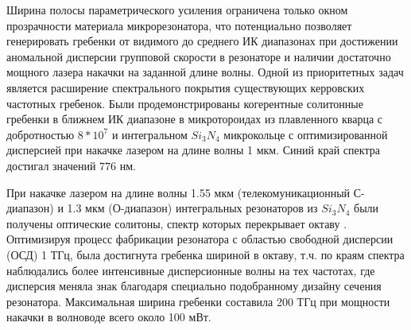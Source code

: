 Ширина полосы параметрического усиления ограничена только окном прозрачности материала микрорезонатора, что потенциально позволяет генерировать гребенки от видимого до среднего ИК диапазонах при достижении аномальной дисперсии групповой скорости в резонаторе и наличии достаточно мощного лазера накачки на заданной длине волны. Одной из приоритетных задач является расширение спектрального покрытия существующих керровских частотных гребенок. Были продемонстрированы когерентные солитонные гребенки в ближнем ИК диапазоне в микротороидах из плавленного кварца с добротностью $8*10^7$ \cite{Lee2017} и интегральном $Si_3N_4$ микрокольце с оптимизированной дисперсией \cite{Karpov2018} при накачке лазером на длине волны 1 мкм. Синий край спектра достигал значений $776$ нм.

При накачке лазером на длине волны 1.55 мкм (телекомуникационный С-диапазон) и 1.3 мкм (О-диапазон) интегральных резонаторов из $Si_3N_4$ были получены оптические солитоны, спектр которых перекрывает октаву \cite{Li:17,Pfeiffer:17}. Оптимизируя процесс фабрикации резонатора с областью свободной дисперсии (ОСД) 1 ТГц, была достигнута гребенка шириной в октаву, т.ч. по краям спектра наблюдались более интенсивные дисперсионные волны на тех частотах, где дисперсия меняла знак благодаря специально подобранному дизайну сечения резонатора. Максимальная ширина гребенки составила 200 ТГц при мощности накачки в волноводе всего около 100 мВт.

